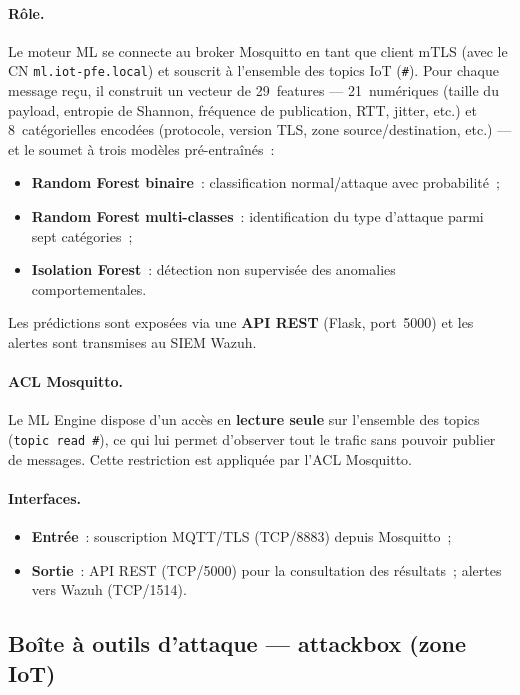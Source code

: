 \paragraph{Rôle.}
Le moteur ML se connecte au broker Mosquitto en tant que client mTLS (avec le CN \texttt{ml.iot-pfe.local}) et souscrit à l'ensemble des topics IoT (\texttt{\#}). Pour chaque message reçu, il construit un vecteur de 29~features --- 21~numériques (taille du payload, entropie de Shannon, fréquence de publication, RTT, jitter, etc.) et 8~catégorielles encodées (protocole, version TLS, zone source/destination, etc.) --- et le soumet à trois modèles pré-entraînés~:

\begin{itemize}[leftmargin=*]
  \item \textbf{Random Forest binaire}~: classification normal/attaque avec probabilité~;
  \item \textbf{Random Forest multi-classes}~: identification du type d'attaque parmi sept catégories~;
  \item \textbf{Isolation Forest}~: détection non supervisée des anomalies comportementales.
\end{itemize}

Les prédictions sont exposées via une \textbf{API REST} (Flask, port~5000) et les alertes sont transmises au SIEM Wazuh.

\paragraph{ACL Mosquitto.}
Le ML Engine dispose d'un accès en \textbf{lecture seule} sur l'ensemble des topics (\texttt{topic read \#}), ce qui lui permet d'observer tout le trafic sans pouvoir publier de messages. Cette restriction est appliquée par l'ACL Mosquitto.

\paragraph{Interfaces.}
\begin{itemize}[leftmargin=*]
  \item \textbf{Entrée}~: souscription MQTT/TLS (TCP/8883) depuis Mosquitto~;
  \item \textbf{Sortie}~: API REST (TCP/5000) pour la consultation des résultats~; alertes vers Wazuh (TCP/1514).
\end{itemize}

\subsection{Boîte à outils d'attaque --- attackbox (zone IoT)}
\label{subsec:env-attackbox}


